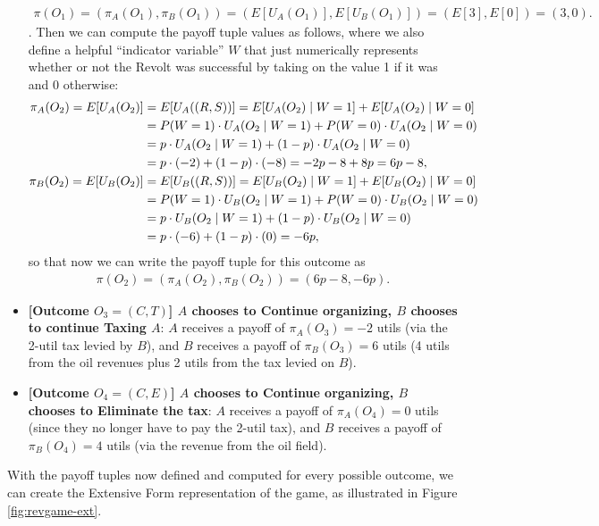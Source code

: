 \begin{itemize}
{    \begin{align*}
        \pi(O_1) = (\pi_A(O_1),\pi_B(O_1)) = (E[U_A(O_1)], E[U_B(O_1)]) = (E[3],E[0]) = (3,0).
    \end{align*}}. Then we can compute the payoff tuple values as follows, where we also define a helpful ``indicator variable'' $W$ that just numerically represents whether or not the Revolt was successful by taking on the value 1 if it was and 0 otherwise:
    \begin{align*}
        \pi_A(O_2) = E[U_A(O_2)] &= E[U_A((R,S))] = E[U_A(O_2)\; | \;{}W=1] + E[U_A(O_2)\; | \;{}W=0] \\
        &= P(W=1)\cdot U_A(O_2\; | \;{}W=1) + P(W=0)\cdot U_A(O_2\; | \;{}W=0) \\
        &= p\cdot U_A(O_2\; | \;{} W=1) + (1-p)\cdot U_A(O_2\; | \;{} W=0) \\
        &= p\cdot(-2) + (1-p)\cdot(-8) = -2p - 8 + 8p = 6p - 8, \\
        \pi_B(O_2) = E[U_B(O_2)] &= E[U_B((R,S))] = E[U_B(O_2)\; | \;{}W=1] + E[U_B(O_2)\; | \;{}W=0] \\
        &= P(W=1)\cdot U_B(O_2\; | \;{}W=1) + P(W=0)\cdot U_B(O_2\; | \;{}W=0) \\
        &= p\cdot U_B(O_2\; | \;{} W=1) + (1-p)\cdot U_B(O_2\; | \;{} W=0) \\
        &= p\cdot(-6) + (1-p)\cdot(0) = -6p,
    \end{align*}
    so that now we can write the payoff tuple for this outcome as
    \begin{align*}
        \pi(O_2) = (\pi_A(O_2),\pi_B(O_2)) = (6p-8,-6p).
    \end{align*}
    \item \textbf{[Outcome $O_3 = (C,T)$] $A$ chooses to Continue organizing, $B$ chooses to continue Taxing $A$}: $A$ receives a payoff of $\pi_A(O_3) = -2$ utils (via the 2-util tax levied by $B$), and $B$ receives a payoff of $\pi_B(O_3) = 6$ utils (4 utils from the oil revenues plus 2 utils from the tax levied on $B$).
    \item \textbf{[Outcome $O_4 = (C,E)$] $A$ chooses to Continue organizing, $B$ chooses to Eliminate the tax}: $A$ receives a payoff of $\pi_A(O_4) = 0$ utils (since they no longer have to pay the 2-util tax), and $B$ receives a payoff of $\pi_B(O_4) = 4$ utils (via the revenue from the oil field).
\end{itemize}
With the payoff tuples now defined and computed for every possible outcome, we can create the Extensive Form representation of the game, as illustrated in Figure \ref{fig:revgame-ext}.


